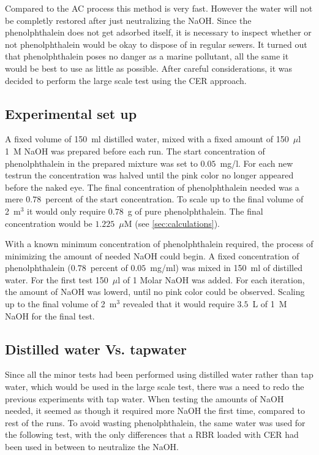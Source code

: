 Compared to the AC process this method is very fast. However the water will not be completly restored after just neutralizing the NaOH. Since the phenolphthalein does not get adsorbed itself, it is necessary to inspect whether or not phenolphthalein would be okay to dispose of in regular sewers. It turned out that phenolphthalein poses no danger as a marine pollutant\cite{url}, all the same it would be best to use as little as possible.
After careful considerations, it was decided to perform the large scale test using the CER approach.

\subsection{Experimental set up}
A fixed volume of 150~ml distilled water, mixed with a fixed amount of 150~$\mu$l 1~M NaOH was prepared before each run. The start concentration of phenolphthalein in the prepared mixture was set to $0.05$~mg/l. For each new testrun the concentration was halved until the pink color no longer appeared before the naked eye. The final concentration of phenolphthalein needed was a mere $0.78$~percent of the start concentration. To scale up to the final volume of 2~m$^3$ it would only require $0.78$~g of pure phenolphthalein. The final concentration would be $1.225$~$\mu$M (see \cref{sec:calculations}).

With a known minimum concentration of phenolphthalein required, the process of minimizing the amount of needed NaOH could begin. A fixed concentration of phenolphthalein ($0.78$~percent of $0.05$~mg/ml) was mixed in 150~ml of distilled water. For the first test 150~$\mu$l of 1 Molar NaOH was added. For each iteration, the amount of NaOH was lowerd, until no pink color could be observed.  Scaling up to the final volume of 2~m$^3$ revealed that it would require $3.5$~L of 1~M NaOH for the final test.

\subsection{Distilled water Vs. tapwater}
Since all the minor tests had been performed using distilled water rather than tap water, which would be used in the large scale test, there was a need to redo the previous experiments with tap water. When testing the amounts of NaOH needed, it seemed as though it required more NaOH the first time, compared to rest of the runs. To avoid wasting phenolphthalein, the same water was used for the following test, with the only differences that a RBR loaded with CER had been used in between to neutralize the NaOH.

